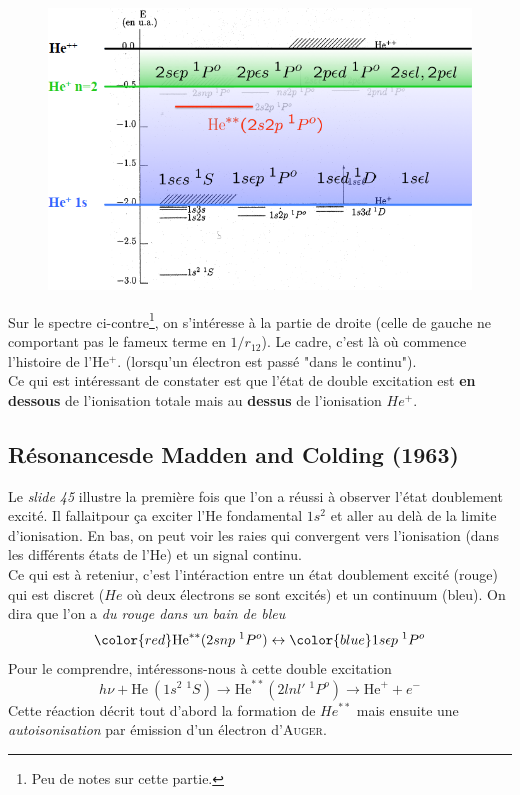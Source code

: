 	\begin{figure}
	\vspace{-7mm}
	\includegraphics[scale=0.45]{ch3/image8}
	\end{figure}
Sur le spectre ci-contre\footnote{Peu de notes sur cette partie.}, on s'intéresse à la partie de
droite (celle de gauche ne comportant pas le fameux terme en $1/r_{12}$). Le cadre, c'est là où
commence l'histoire de l'He$^+$. (lorsqu'un électron est passé "dans le continu").\\

Ce qui est intéressant de constater est que l'état de double excitation est \textbf{en dessous} 
de l'ionisation totale mais au \textbf{dessus} de l'ionisation $He^+$.
 
 
 
\subsection{Résonancesde Madden and Colding (1963)} 
Le \textit{slide 45} illustre la première fois que l'on a réussi à observer l'état doublement 
excité. Il fallaitpour ça exciter l'He fondamental $1s^2$ et aller au delà de la limite d'ionisation.
En bas, on peut voir les raies qui convergent vers l'ionisation (dans les différents états de 
l'He) et un signal continu. \\

Ce qui est à reteniur, c'est l'intéraction entre un état doublement excité (rouge) qui est discret 
($He$ où deux électrons se sont excités) et un continuum (bleu). On dira que l'on a \textit{du rouge
dans un bain de bleu}
\begin{equation}
{\color{red}
 \mbox{He}^{\ast \ast} 
(2snp\; ^1P^o)}
 \leftrightarrow 
{\color{blue}1s \epsilon p \; ^1P^o }
\end{equation}
Pour le comprendre, intéressons-nous à cette double excitation
\begin{equation}
h \nu + \mbox{He}~(1s^2 \; ^1S) \rightarrow \mbox{He}^{\ast \ast} 
(2lnl' \; ^1P^o) 
\rightarrow  \mbox{He}^+ + e^-
\end{equation}
Cette réaction décrit tout d'abord la formation de $He^{**}$ mais ensuite une \textit{autoisonisation}
par émission d'un électron d'\textsc{Auger}.

